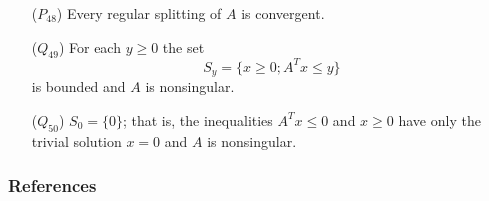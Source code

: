 \documentclass[aspectratio=169]{beamer}
\begin{document}
\begin{frame}
\begin{theorem}
\begin{enumerate}
\item[($P_{48}$)] Every regular splitting of $A$ is convergent.
\item[($Q_{49}$)] For each $y\geq 0$ the set
\[
S_y=\{x\geq 0; A^Tx\leq y\}
\]
is bounded and $A$ is nonsingular.
\item[($Q_{50}$)] $S_0=\{0\}$; that is, the inequalities $A^Tx\leq 0$ and $x\geq 0$ have only the trivial solution $x=0$ and $A$ is nonsingular.
\end{enumerate}
\end{theorem}
\end{frame}


\begin{frame}[allowframebreaks]
    \frametitle{References}
    
    
\end{frame}
    
\end{document}
